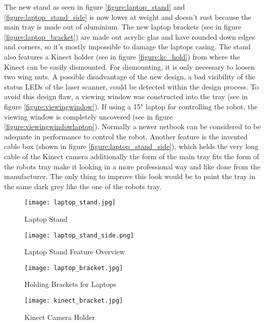 The new stand as seen in figure \vref{figure:laptop_stand} and \vref{figure:laptop_stand_side} is now lower at
weight and doesn't rust because the main tray is made out of aluminium. The new laptop brackets 
(see in figure \vref{figure:laptop_bracket}) are made out acrylic glas and have rounded down edges and corners, 
so it's mostly impossible to damage the laptops casing. The stand also features a Kinect holder 
(see in figure \vref{figure:kc_hold}) from where the Kinect can be easily dismounted. For dismounting, 
it is only necessary to loosen two wing nuts. A possible disadvantage of the new design, a bad visibility of
the status LEDs of the laser scanner, could be detected within the design process. 
To avoid this design flaw, a viewing window was constructed into the tray (see in figure \vref{figure:viewingwindow}). 
If using a 15" laptop for controlling the robot, the viewing window is completely uncovered 
(see in figure \vref{figure:viewingwindowlaptop}). Normally a newer netbook can be considered to be 
adequate in performance to control the robot. Another feature is the invented cable box 
(shown in figure \vref{figure:laptop_stand_side}), which helds the very long cable of the Kinect camera 
additionally the form of the main tray fits the form of the robots tray make it looking in a more professional 
way and like done from the manufacturer. The only thing to improve this look would be to paint the tray in the 
same dark grey like the one of the robots tray.

\begin{figure}[htp]
\begin{center}
  \texttt{[image: laptop\_stand.jpg]}
  \caption{Laptop Stand}
  \label{figure:laptop_stand}
\end{center}
\end{figure}
\begin{figure}[htp]
\begin{center}
  \texttt{[image: laptop\_stand\_side.png]}
  \caption{Laptop Stand Feature Overview}
  \label{figure:laptop_stand_side}
\end{center}
\end{figure}


\begin{figure}[htp]
\begin{center}
  \texttt{[image: laptop\_bracket.jpg]}
  \caption{Holding Brackets for Laptops}
  \label{figure:laptop_bracket}
\end{center}
\end{figure}
\begin{figure}[htp]
\begin{center}
  \texttt{[image: kinect\_bracket.jpg]}
  \caption{Kinect Camera Holder}
  \label{figure:kc_hold}
\end{center}
\end{figure}

